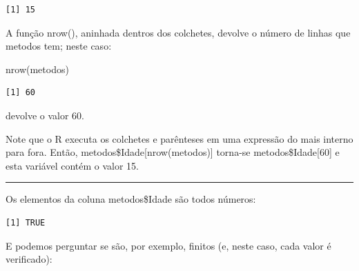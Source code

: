 \documentclass[
]{article}
\newenvironment{Shaded}{\begin{snugshade}}{\end{snugshade}}
\newcommand{\FunctionTok}[1]{\textcolor[rgb]{0.00,0.00,0.00}{#1}}
\newcommand{\NormalTok}[1]{#1}
\newcommand{\SpecialCharTok}[1]{\textcolor[rgb]{0.00,0.00,0.00}{#1}}
\begin{document}
\begin{Shaded}
\end{Shaded}

\begin{verbatim}
[1] 15
\end{verbatim}

A função nrow(), aninhada dentros dos colchetes, devolve o número de
linhas que metodos tem; neste caso:

\begin{Shaded}
\begin{Highlighting}[]
\FunctionTok{nrow}\NormalTok{(metodos)}
\end{Highlighting}
\end{Shaded}

\begin{verbatim}
[1] 60
\end{verbatim}

devolve o valor 60.

Note que o R executa os colchetes e parênteses em uma expressão do mais
interno para fora. Então, metodos\$Idade{[}nrow(metodos){]} torna-se
metodos\$Idade{[}60{]} e esta variável contém o valor 15.

\begin{center}\rule{0.5\linewidth}{0.5pt}\end{center}

Os elementos da coluna metodos\$Idade são todos números:

\begin{Shaded}
\end{Shaded}

\begin{verbatim}
[1] TRUE
\end{verbatim}

E podemos perguntar se são, por exemplo, finitos (e, neste caso, cada
valor é verificado):

\begin{Shaded}
\end{Shaded}
\end{document}
